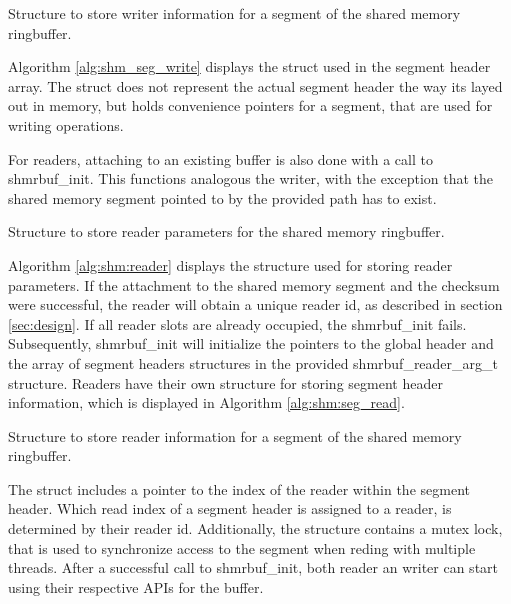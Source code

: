 \begin{algorithm}[h!]
    
    \label{alg:shm_seg_write}
    \caption[Shared Memory Ringbuffer: Writer Segment Header]{Structure to store writer information for a segment of the shared memory ringbuffer.}
\end{algorithm}
Algorithm \ref{alg:shm_seg_write} displays the struct  used in the segment header array. The struct does not represent the actual segment header the way its layed out in memory, but holds convenience pointers for a segment, that are used for writing operations.   
   
\par
For readers, attaching to an existing buffer is also done with a call to shmrbuf\_init. This functions analogous the writer, with the exception that the
shared memory segment pointed to by the provided path has to exist. 
\begin{algorithm}[h!]
    
    \label{alg:shm:reader_arg}
    \caption[Shared Memory Ringbuffer: Reader Parameters]{Structure to store reader parameters for the shared memory ringbuffer.}
\end{algorithm}
Algorithm \ref{alg:shm:reader} displays the structure used for storing reader parameters. If the attachment to the shared memory segment
and the checksum were successful, the reader will obtain a unique reader id, as described in section \ref{sec:design}. If all reader slots are already occupied, the shmrbuf\_init fails.
Subsequently, shmrbuf\_init will initialize the pointers to the global header and the array of segment headers structures in the provided shmrbuf\_reader\_arg\_t structure.  
Readers have their own structure for storing segment header information, which is displayed in Algorithm \ref{alg:shm:seg_read}.  
\begin{algorithm}[h!]
    
    \label{alg:shm:seg_read}
    \caption[Shared Memory Ringbuffer: Reader Segment Header]{Structure to store reader information for a segment of the shared memory ringbuffer.}
\end{algorithm}

The struct includes a pointer to the index of the reader within the segment header. Which read index of a segment header is assigned to a reader, is determined 
by their reader id. Additionally, the structure contains a mutex lock, that is used to synchronize access to the segment when reding with multiple threads.
After a successful call to shmrbuf\_init, both reader an writer can start using their respective APIs for the buffer.

